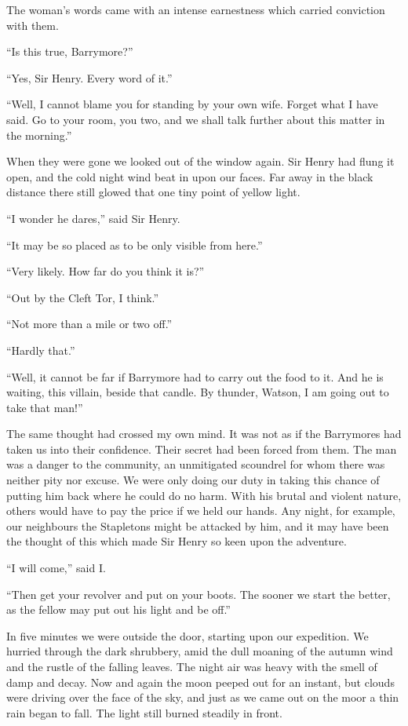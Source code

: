 \documentclass[paper=a5,BCOR=7mm,twoside,DIV=calc,12pt,usegeometry,openany,chapterprefix,endperiod,headings=big]{scrbook} %
\begin{document}
The woman's words came with an intense earnestness which carried conviction with them.

\enquote{Is this true, Barrymore?}

\enquote{Yes, Sir Henry. Every word of it.}

\enquote{Well, I cannot blame you for standing by your own wife. Forget what I have said. Go to your room, you two, and we shall talk further about this matter in the morning.}

When they were gone we looked out of the window again. Sir Henry had flung it open, and the cold night wind beat in upon our faces. Far away in the black distance there still glowed that one tiny point of yellow light.

\enquote{I wonder he dares,} said Sir Henry.

\enquote{It may be so placed as to be only visible from here.}

\enquote{Very likely. How far do you think it is?}

\enquote{Out by the Cleft Tor, I think.}

\enquote{Not more than a mile or two off.}

\enquote{Hardly that.}

\enquote{Well, it cannot be far if Barrymore had to carry out the food to it. And he is waiting, this villain, beside that candle. By thunder, Watson, I am going out to take that man!}

The same thought had crossed my own mind. It was not as if the Barrymores had taken us into their confidence. Their secret had been forced from them. The man was a danger to the community, an unmitigated scoundrel for whom there was neither pity nor excuse. We were only doing our duty in taking this chance of putting him back where he could do no harm. With his brutal and violent nature, others would have to pay the price if we held our hands. Any night, for example, our neighbours the Stapletons might be attacked by him, and it may have been the thought of this which made Sir Henry so keen upon the adventure.

\enquote{I will come,} said I.

\enquote{Then get your revolver and put on your boots. The sooner we start the better, as the fellow may put out his light and be off.}

In five minutes we were outside the door, starting upon our expedition. We hurried through the dark shrubbery, amid the dull moaning of the autumn wind and the rustle of the falling leaves. The night air was heavy with the smell of damp and decay. Now and again the moon peeped out for an instant, but clouds were driving over the face of the sky, and just as we came out on the moor a thin rain began to fall. The light still burned steadily in front.
\end{document}
